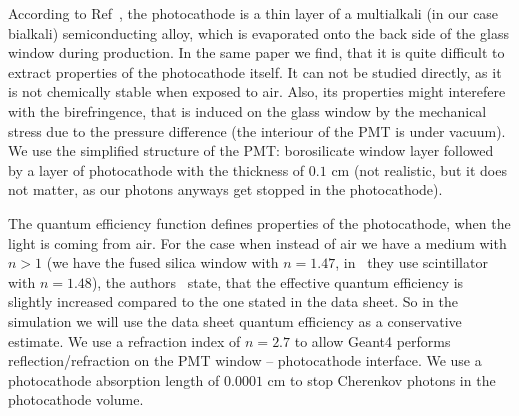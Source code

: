 According to Ref~\cite{pcpaper}, the photocathode is a thin layer of a multialkali (in our case bialkali) semiconducting alloy, which is evaporated onto the back side of the glass window during production. In the same paper we find, that it is quite difficult to extract properties of the photocathode itself. It can not be studied directly, as it is not chemically stable when exposed to air. Also, its properties might interefere with the birefringence, that is induced on the glass window by the mechanical stress due to the pressure difference (the interiour of the PMT is under vacuum). We use the simplified structure of the PMT: borosilicate window layer followed by a layer of photocathode with the thickness of $0.1$ cm (not realistic, but it does not matter, as our photons anyways get stopped in the photocathode). 

The quantum efficiency function defines properties of the photocathode, when the light is coming from air. For the case when instead of air we have a medium with $n > 1$ (we have the fused silica window with $n = 1.47$, in~\cite{pcpaper} they use scintillator with $n = 1.48$), the authors~\cite{pcpaper} state, that the effective quantum efficiency is slightly increased compared to the one stated in the data sheet. So in the simulation we will use the data sheet quantum efficiency as a conservative estimate. We use a refraction index of $n = 2.7$ to allow Geant4 performs reflection/refraction on the PMT window -- photocathode interface. We use a photocathode absorption length of $0.0001$ cm to stop Cherenkov photons in the photocathode volume.





